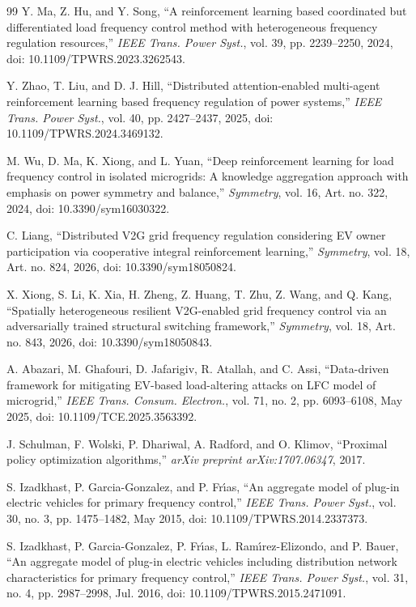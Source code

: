 \begin{thebibliography}{99}
Y. Ma, Z. Hu, and Y. Song,
``A reinforcement learning based coordinated but differentiated load
frequency control method with heterogeneous frequency regulation resources,''
\emph{IEEE Trans. Power Syst.}, vol. 39, pp. 2239--2250, 2024,
doi: 10.1109/TPWRS.2023.3262543.

Y. Zhao, T. Liu, and D. J. Hill,
``Distributed attention-enabled multi-agent reinforcement learning based
frequency regulation of power systems,''
\emph{IEEE Trans. Power Syst.}, vol. 40, pp. 2427--2437, 2025,
doi: 10.1109/TPWRS.2024.3469132.

M. Wu, D. Ma, K. Xiong, and L. Yuan,
``Deep reinforcement learning for load frequency control in isolated
microgrids: A knowledge aggregation approach with emphasis on power
symmetry and balance,''
\emph{Symmetry}, vol. 16, Art. no. 322, 2024,
doi: 10.3390/sym16030322.

C. Liang,
``Distributed V2G grid frequency regulation considering EV owner
participation via cooperative integral reinforcement learning,''
\emph{Symmetry}, vol. 18, Art. no. 824, 2026,
doi: 10.3390/sym18050824.

X. Xiong, S. Li, K. Xia, H. Zheng, Z. Huang, T. Zhu, Z. Wang,
and Q. Kang,
``Spatially heterogeneous resilient V2G-enabled grid frequency control
via an adversarially trained structural switching framework,''
\emph{Symmetry}, vol. 18, Art. no. 843, 2026,
doi: 10.3390/sym18050843.

A. Abazari, M. Ghafouri, D. Jafarigiv, R. Atallah, and C. Assi,
``Data-driven framework for mitigating EV-based load-altering attacks
on LFC model of microgrid,''
\emph{IEEE Trans. Consum. Electron.}, vol. 71, no. 2,
pp. 6093--6108, May 2025,
doi: 10.1109/TCE.2025.3563392.

J. Schulman, F. Wolski, P. Dhariwal, A. Radford, and O. Klimov,
``Proximal policy optimization algorithms,''
\emph{arXiv preprint arXiv:1707.06347}, 2017.

S. Izadkhast, P. Garcia-Gonzalez, and P. Fr\'{\i}as,
``An aggregate model of plug-in electric vehicles for primary frequency control,''
\emph{IEEE Trans. Power Syst.}, vol. 30, no. 3, pp. 1475--1482, May 2015,
doi: 10.1109/TPWRS.2014.2337373.

S. Izadkhast, P. Garcia-Gonzalez, P. Fr\'{\i}as, L. Ram\'{\i}rez-Elizondo, and P. Bauer,
``An aggregate model of plug-in electric vehicles including distribution network
characteristics for primary frequency control,''
\emph{IEEE Trans. Power Syst.}, vol. 31, no. 4, pp. 2987--2998, Jul. 2016,
doi: 10.1109/TPWRS.2015.2471091.


\end{thebibliography}
